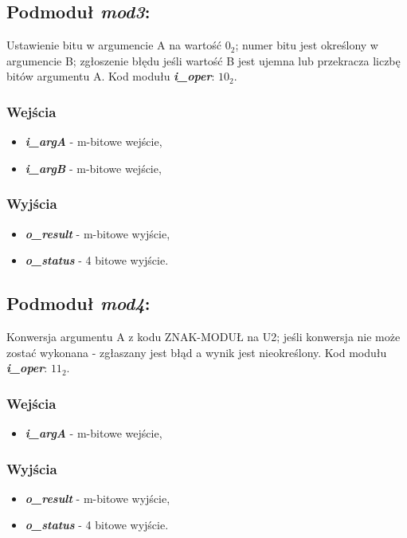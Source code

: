 \subsection{Podmoduł \emph{mod3}:}
Ustawienie bitu w argumencie A na wartość \(0_2\); numer bitu jest określony w argumencie B; zgłoszenie błędu jeśli wartość B jest ujemna lub przekracza liczbę bitów argumentu A. Kod modułu \textbf{\emph{i\_oper}}: \(10_2\).

\subsubsection*{Wejścia}
\begin{itemize}
	\item \emph{\textbf{i\_argA}} - m-bitowe wejście,
	\item \emph{\textbf{i\_argB}} - m-bitowe wejście,
\end{itemize}
\subsubsection*{Wyjścia}
\begin{itemize}
	\item \emph{\textbf{o\_result}} - m-bitowe wyjście,
	\item \emph{\textbf{o\_status}} - 4 bitowe wyjście.
\end{itemize}

\subsection{Podmoduł \emph{mod4}:}
Konwersja argumentu A z kodu ZNAK-MODUŁ na U2; jeśli konwersja nie może zostać wykonana - zgłaszany jest błąd a wynik jest nieokreślony. Kod modułu \textbf{\emph{i\_oper}}: \(11_2\).

\subsubsection*{Wejścia}
\begin{itemize}
	\item \emph{\textbf{i\_argA}} - m-bitowe wejście,
\end{itemize}
\subsubsection*{Wyjścia}
\begin{itemize}
	\item \emph{\textbf{o\_result}} - m-bitowe wyjście,
	\item \emph{\textbf{o\_status}} - 4 bitowe wyjście.
\end{itemize}